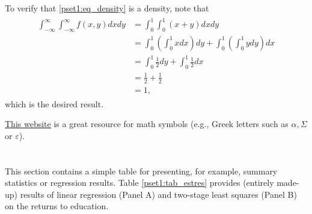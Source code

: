 To verify that \eqref{pset1:eq_density} is a density, note that
\begin{align}
    \begin{aligned} %
        \int_{-\infty}^\infty\int_{-\infty}^\infty f(x, y) dxdy & = \int_0^1\int_0^1 (x + y) dxdy \\
        & = \int_0^1\left(\int_0^1 x dx\right)dy + \int_0^1\left(\int_0^1 y dy\right)dx \\
        & = \int_0^1\frac{1}{2}dy + \int_0^1\frac{1}{2}dx \\
        & = \frac{1}{2} + \frac{1}{2}\\
        & = 1,
    \end{aligned}
\end{align}
which is the desired result.

\href{https://oeis.org/wiki/List_of_LaTeX_mathematical_symbols}{\underline{This website}} is a great resource for math symbols (e.g., Greek letters such as $\alpha, \Sigma$ or $\varepsilon$).

\newpage
\section{}

This section contains a simple table for presenting, for example, summary statistics or regression results. Table \ref{pset1:tab_estres} provides (entirely made-up) results of linear regression (Panel A) and two-stage least squares (Panel B) on the returns to education. 

